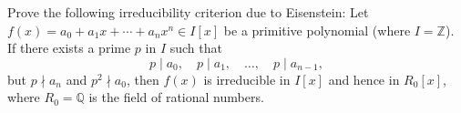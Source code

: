 Prove the following irreducibility criterion due to Eisenstein: Let $f(x) = a_0 + a_1 x + \cdots + a_n x^n \in I[x]$ be a primitive polynomial (where $I = \mathbb{Z}$). If there exists a prime $p$ in $I$ such that
$$p \mid a_0,\quad p \mid a_1,\quad \dots,\quad p \mid a_{n-1},$$
but $p \nmid a_n$ and $p^2 \nmid a_0$, then $f(x)$ is irreducible in $I[x]$ and hence in $R_0[x]$, where $R_0 = \mathbb{Q}$ is the field of rational numbers.